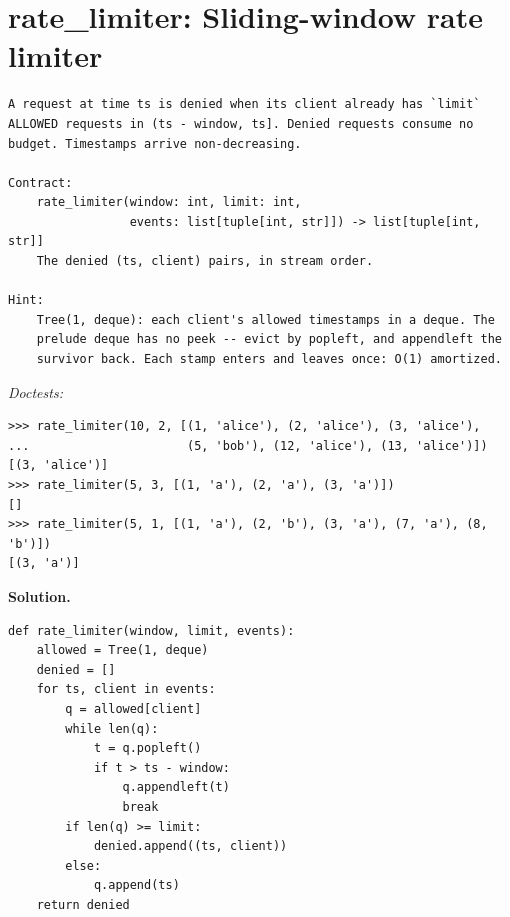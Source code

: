 \documentclass[11pt,letterpaper]{book}
\begin{document}
\section{rate\_limiter: Sliding-window rate limiter}
\begin{lstlisting}[style=spec]
A request at time ts is denied when its client already has `limit`
ALLOWED requests in (ts - window, ts]. Denied requests consume no
budget. Timestamps arrive non-decreasing.

Contract:
    rate_limiter(window: int, limit: int,
                 events: list[tuple[int, str]]) -> list[tuple[int, str]]
    The denied (ts, client) pairs, in stream order.

Hint:
    Tree(1, deque): each client's allowed timestamps in a deque. The
    prelude deque has no peek -- evict by popleft, and appendleft the
    survivor back. Each stamp enters and leaves once: O(1) amortized.
\end{lstlisting}
\noindent\textit{Doctests:}
\begin{lstlisting}[style=spec]
>>> rate_limiter(10, 2, [(1, 'alice'), (2, 'alice'), (3, 'alice'),
...                      (5, 'bob'), (12, 'alice'), (13, 'alice')])
[(3, 'alice')]
>>> rate_limiter(5, 3, [(1, 'a'), (2, 'a'), (3, 'a')])
[]
>>> rate_limiter(5, 1, [(1, 'a'), (2, 'b'), (3, 'a'), (7, 'a'), (8, 'b')])
[(3, 'a')]
\end{lstlisting}
\noindent\textbf{Solution.}
\begin{lstlisting}[style=code]
def rate_limiter(window, limit, events):
    allowed = Tree(1, deque)
    denied = []
    for ts, client in events:
        q = allowed[client]
        while len(q):
            t = q.popleft()
            if t > ts - window:
                q.appendleft(t)
                break
        if len(q) >= limit:
            denied.append((ts, client))
        else:
            q.append(ts)
    return denied
\end{lstlisting}
\end{document}
